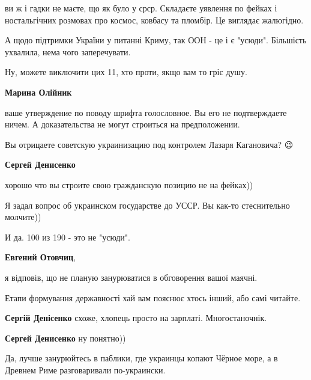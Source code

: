 \begin{itemize}
\begin{itemize}
ви ж і гадки не маєте, що як було у срср. Складаєте уявлення по фейках і
ностальгічних розмовах про космос, ковбасу та пломбір. Це виглядає жалюгідно.

А щодо підтримки України у питанні Криму, так ООН - це і є "усюди". Більшість
ухвалила, нема чого заперечувати.

Ну, можете виключити цих 11, хто проти, якщо вам то гріє душу.



\textbf{Марина Олійник} 

ваше утверждение по поводу шрифта голословное. Вы его не подтверждаете ничем. А
доказательства не могут строиться на предположении.

Вы отрицаете советскую украинизацию под контролем Лазаря Кагановича? 😉


\textbf{Сергей Денисенко} 

хорошо что вы строите свою гражданскую позицию не на фейках))

Я задал вопрос об украинском государстве до УССР. Вы как-то стеснительно молчите))

И да. 100 из 190 - это не "усюди".



\textbf{Евгений Отовчиц}, 

я відповів, що не планую занурюватися в обговорення вашої маячні.

Етапи формування державності хай вам пояснює хтось інший, або самі читайте.


\textbf{Сергій Денісенко} схоже, хлопець просто на зарплаті. Многостаночнік.


\textbf{Сергей Денисенко} ну понятно))

Да, лучше занурюйтесь в паблики, где украинцы копают Чёрное море, а в Древнем
Риме разговаривали по-украински.


\end{itemize}
\end{itemize}
